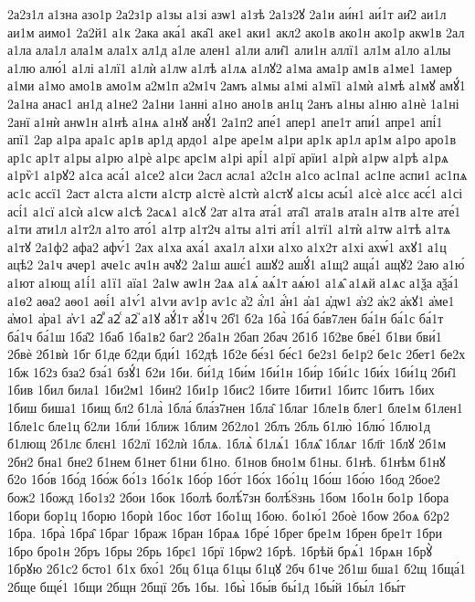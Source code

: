 {2а2з1л
а1зна
азо1р
2а2з1р
а1зы
а1зі
азѡ1
а1зѣ
2а1з2ꙋ
2а1и
аи́н1
аи́1т
аи̑2
аи1л
аи1м
аимо1
2а2й1
а1к
2ака
ака́1
ака̑1
аке1
аки1
акл2
ако1в
ако1н
ако1р
акѡ1в
2ал
а1ла
ала1л
ала1м
ала1х
ал1д
а1ле
ален1
а1ли
али̑1
али1н
аллї1
ал1м
а1ло
а1лы
а1лю
алю́1
а1лі
а1лї1
а1лѝ
а1лѡ
а1лѣ
а1лѧ
а1лꙋ2
а1ма
ама1р
ам1в
а1ме1
1амер
а1ми
а1мо
амо1в
амо1м
а2м1п
а2м1ч
2амъ
а1мы
а1мі
а1мї1
а1мѝ
а1мѣ
а1мꙋ
амꙋ́1
2а1на
анас1
ан1д
а1не2
2а1ни
1анні
а1но
ано1в
ан1ц
2анъ
а1ны
а1ню
а1нѐ
1а1ні
2анї
а1нѝ
анѡ1н
а1нѣ
а1нѧ
а1нꙋ
анꙋ́1
2а1п2
апе́1
апер1
апе1т
апи́1
апре1
апі́1
апї1
2ар
а1ра
ара1с
ар1в
ар1д
ардо1
а1ре
аре1м
а1ри
ар1к
ар1л
ар1м
а1ро
аро1в
ар1с
ар1т
а1ры
а1рю
а1рѐ
а1рє
арє1м
а1рі
арі́1
а1рї
арїи1
а1рѝ
а1рѡ
а1рѣ
а1рѧ
а1рѷ1
а1рꙋ2
а1са
аса́1
а1се2
а1си
2асл
асла1
а2с1н
а1со
ас1па1
ас1пе
аспи1
ас1пѧ
ас1с
ассї1
2аст
а1ста
а1сти
а1стр
а1стѐ
а1стѝ
а1стꙋ
а1сы
асы́1
а1сѐ
а1сє
асє́1
а1сі
асі́1
а1сї
а1сѝ
а1сѡ
а1сѣ
2асѧ1
а1сꙋ
2ат
а1та
ата́1
ата̑1
ата1в
ата1н
а1тв
а1те
ате́1
а1ти
ати1л
а1т2л
а1то
ато́1
а1тр
а1т2ч
а1ты
а1ті
аті́1
а1тї1
а1тѝ
а1тѡ
а1тѣ
а1тѧ
а1тꙋ
2а1ф2
афа2
афѵ́1
2ах
а1ха
аха́1
аха1л
а1хи
а1хо
а1х2т
а1хі
ахѡ́1
ахꙋ1
а1ц
ацѣ2
2а1ч
ачер1
аче1с
ач1н
ачꙋ2
2а1ш
ашє́1
ашꙋ2
ашꙋ́1
а1щ2
аща́1
ащꙋ2
2аю
а1ю́
а1ют
а1ющ
а1і́1
а1ї1
аїа1
2а1ѡ
аѡ1н
2аѧ
а1ѧ́
аѧ́1т
аѧ́ю1
а1ѧ̑
а1ѧй
а1ѧс
а1ѯа
аѯа́1
а1ѳ2
аѳа2
аѳо1
аѳі́1
а1ѵ́1
а1ѵи
аѵ1р
аѵ1с
а҆2
а҆́л1
а҆́н1
а҆а1
а҆дѡ1
а҆з2
а҆к2
а҆кꙋ1
а҆ме1
а҆мо1
а҆ра1
а҆ѵ1
а2ⷡ
а2ⷭ
а2ⷱ
а1ꙋ
аꙋ́1т
аꙋ́1ч
2б̾1
б2а
1ба̀
1ба́
ба́в7лен
ба́1н
ба́1с
ба́1т
ба́1ч
ба́1ш
1ба̑2
1баб
1ба1в2
баг2
2ба1н
2бап
2бач
2б1б
1б2ве
бве́1
б1ви
бви́1
2бвѐ
2б1вѝ
1бг
б1де
б2ди
бди́1
1б2дѣ
1б2е
бе́з1
бе́с1
бе2з1
бе1р2
бе1с
2бет1
бе2х
1бж
1б2з
бза2
бза́1
бзꙋ́1
б2и
1би.
би́1д
1би́м
1би́1н
1би́р
1би́1с
1би́х
1би́1ц
2би̑1
1бив
1бил
била1
1би2м1
1бин2
1би1р
1бис2
1бите
1бити1
1битс
1битъ
1бих
1биш
биша1
1бищ
бл2
б1ла̀
1бла́
бла́з7нен
1бла̑
1благ
1бле1в
блег1
бле1м
б1лен1
1бле1с
бле1ц
б2ли
1бли́
1ближ
1блим
2б2ло1
2блъ
2бль
б1лю̀
1блю́
1блю1д
б1лющ
2б1лє
блєн1
1б2лї
1б2лѝ
1блѧ.
1блѧ̀
б1лѧ́1
1блѧ̑
1блѧг
1бл҃г
1блꙋ
2б1м
2бн2
бна1
бне2
б1нем
б1нет
б1ни
б1но.
б1нов
бно1м
б1ны.
б1нѣ.
б1нѣм
б1нꙋ
б2о
1бо́в
1бо́д
1бо́ж
бо́1з
1бо́1к
1бо́р
1бо́т
1бо́х
1бо́1ц
1бо́ш
1бо́ю
1бод
2бое2
бож2
1божд
1бо1з2
2бои
1бок
1болѣ
болѣ́7зн
болѣ́8знь
1бом
1бо1н
бо1р
1бора
1бори
бор1ц
1борю
1борѝ
1бос
1бот
1бо1щ
1бою.
бо1ю́1
2боѐ
1боѡ
2боѧ
б2р2
1бра.
1бра̀
1бра̑
1браг
1браж
1бран
1браѧ
1бре́
1брег
бре1м
1брен
бре1т
1бри
1бро
бро1н
2бръ
1бры
2брь
1брє1
1брї
1брѡ2
1брѣ.
1брѣй
брѧ́1
1брѧн
1брꙋ̀
1брꙋю
2б1с2
бсто1
б1х
бхо́1
2бц
б1ца
б1цы
б1цꙋ
2бч
б1че
2б1ш
бша1
б2щ
1бща́1
2бще
бще́1
1бщи
2бщн
2бщї
2бъ
1бы.
1бы̀
1бы́в
бы́1д
1бы́й
1бы́л
1бы́т
}
